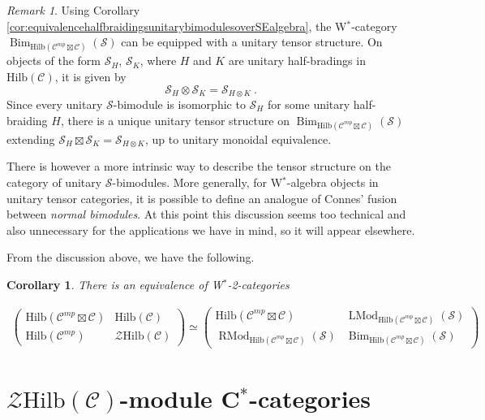 \documentclass[a4paper,11pt,reqno]{amsart}
\numberwithin{equation}{section}
\newtheorem{corollary}[theorem]{Corollary}
\theoremstyle{remark}
\newtheorem{remark}[theorem]{Remark}
\theoremstyle{definition}
\newcommand{\cC}{\mathcal C}
\newcommand{\cS}{\mathcal S}
\newcommand{\cZ}{\mathcal Z}
\DeclareMathOperator{\Bim}{Bim}
\DeclareMathOperator{\RMod}{RMod}
\DeclareMathOperator{\LMod}{LMod}
\newcommand{\Hilb}{\mathrm{Hilb}}
\begin{document}
\begin{remark}
	\label{rem:tensorstructureofunitarySbimodules}
	Using Corollary \ref{cor:equivalencehalfbraidingsunitarybimodulesoverSEalgebra}, the W$^*$-category $\Bim_{\Hilb(\cC^{mp} \boxtimes \cC)}(\cS)$ can be equipped with a unitary tensor structure. On objects of the form $\cS_H$, $\cS_K$, where $H$ and $K$ are unitary half-bradings in $\Hilb(\cC)$, it is given by
	\[
	\cS_H \otimes \cS_K = \cS_{H \otimes K} \ .
	\]
	Since every unitary $\cS$-bimodule is isomorphic to $\cS_H$ for some unitary half-braiding $H$, there is a unique unitary tensor structure on $\Bim_{\Hilb(\cC^{mp} \boxtimes \cC)}(\cS)$ extending $\cS_H \boxtimes \cS_K = \cS_{H \otimes K}$, up to unitary monoidal equivalence.
	
	There is however a more intrinsic way to describe the tensor structure on the category of unitary $\cS$-bimodules. More generally, for W$^*$-algebra objects in unitary tensor categories, it is possible to define an analogue of Connes' fusion between {\em normal bimodules}. At this point this discussion seems too technical and also unnecessary for the applications we have in mind, so it will appear elsewhere.
\end{remark}

From the discussion above, we have the following.

\begin{corollary}
	\label{cor:equivalenceof2categories}
	There is an equivalence of W$^*$-2-categories
	
	\begin{align*}
		\left( \begin{matrix}
			\Hilb(\cC^{mp} \boxtimes \cC) & \Hilb(\cC) \\
			\Hilb(\cC^{mp}) & \cZ \Hilb(\cC)
		\end{matrix}
		\right) \simeq \left( \begin{matrix}
			\Hilb(\cC^{mp} \boxtimes \cC) & \LMod_{\Hilb(\cC^{mp} \boxtimes \cC)}(\cS) \\
			\RMod_{\Hilb(\cC^{mp} \boxtimes \cC)}(\cS) & \Bim_{\Hilb(\cC^{mp} \boxtimes \cC)}(\cS)
		\end{matrix}
		\right)
	\end{align*}
\end{corollary}



\section{$\cZ\Hilb(\cC)$-module C$^*$-categories}
\end{document}
